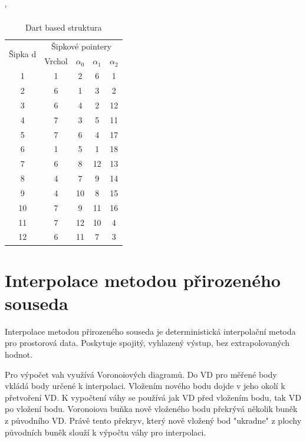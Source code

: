 \documentclass[12pt,a4paper]{article}
\begin{document}
\begin{table}[h!]
\catcode`
\begin{tabular}{|c||c|c|c|c|}
\hline
\multirow{2}{*}{Šipka d} & \multicolumn{4}{c|}{Šipkové pointery} \\ \cline{2-5} 
                         & Vrchol &$\alpha_0$ & $\alpha_1$ & $\alpha_2$      \\ \hline
1                        & 1          & 2      & 6      & 1      \\ \hline
2                        & 6          & 1      & 3      & 2      \\ \hline
3                        & 6          & 4      & 2      & 12     \\ \hline
4                        & 7          & 3      & 5      & 11     \\ \hline
5                        & 7          & 6      & 4      & 17     \\ \hline
6                        & 1          & 5      & 1      & 18     \\ \hline
7                        & 6          & 8      & 12     & 13     \\ \hline
8                        & 4          & 7      & 9      & 14     \\ \hline
9                        & 4          & 10     & 8      & 15     \\ \hline
10                       & 7          & 9      & 11     & 16     \\ \hline
11                       & 7          & 12     & 10     & 4      \\ \hline
12                       & 6          & 11     & 7      & 3      \\ \hline
\end{tabular}
\caption{Dart based struktura}
\label{tab:dart_based}
\end{table}

\newpage
\section{Interpolace metodou přirozeného souseda}

Interpolace metodou přirozeného souseda je deterministická interpolační metoda pro prostorová data. Poskytuje spojitý, vyhlazený výstup, bez extrapolovaných hodnot. 

Pro výpočet vah využívá Voronoiových diagramů. Do VD pro měřené body vkládá body určené k interpolaci. Vložením nového bodu dojde v jeho okolí k přetvoření VD. K vypočtení váhy se používá jak VD před vložením bodu, tak VD po vložení bodu. Voronoiova buňka nově vloženého bodu překrývá několik buněk z původního VD. Právě tento překryv, který nově vložený bod "ukradne" z plochy původních buněk slouží k výpočtu váhy pro interpolaci.
\end{document}
